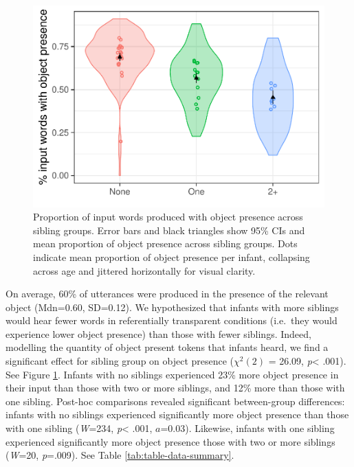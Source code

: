 \documentclass[
  man,floatsintext]{apa6}
\begin{document}
\begin{figure}
\centering
\includegraphics{SiblingsStudyText_files/figure-latex/Figure-object-presence-1.pdf}
\caption{\label{fig:Figure-object-presence}Proportion of input words produced with object presence across sibling groups. Error bars and black triangles show 95\% CIs and mean proportion of object presence across sibling groups. Dots indicate mean proportion of object presence per infant, collapsing across age and jittered horizontally for visual clarity.}
\end{figure}

On average, 60\% of utterances were produced in the presence of the relevant object (Mdn=0.60, SD=0.12). We hypothesized that infants with more siblings would hear fewer words in referentially transparent conditions (i.e.~they would experience lower object presence) than those with fewer siblings. Indeed, modelling the quantity of object present tokens that infants heard, we find a significant effect for sibling group on object presence (\(\chi^2 (2)\) = 26.09, \emph{p}\textless{} .001). See Figure \ref{fig:Figure-object-presence}. Infants with no siblings experienced 23\% more object presence in their input than those with two or more siblings, and 12\% more than those with one sibling. Post-hoc comparisons revealed significant between-group differences: infants with no siblings experienced significantly more object presence than those with one sibling (\emph{W}=234, \emph{p}\textless{} .001, \(a\)=0.03). Likewise, infants with one sibling experienced significantly more object presence those with two or more siblings (\emph{W}=20, \emph{p}=.009). See Table \ref{tab:table-data-summary}.
\end{document}
